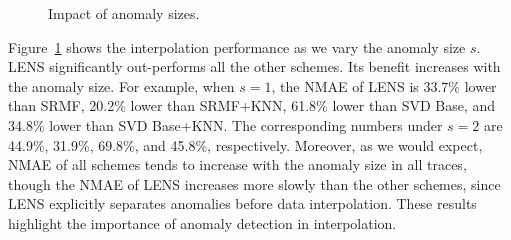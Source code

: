 \begin{figure}[h!]
{  }
  \caption{Impact of anomaly sizes.}
  \label{fig:anomaly-size-interpolation}
\end{figure}

Figure~\ref{fig:anomaly-size-interpolation} shows the interpolation
performance as we vary the anomaly size $s$. LENS 
significantly out-performs all the other schemes. Its benefit
increases with the anomaly size. For example, when $s=1$,
the NMAE of LENS is 33.7\% lower than SRMF,
20.2\% lower than SRMF+KNN, 61.8\% lower than SVD Base, and 34.8\% lower than
SVD Base+KNN. The corresponding numbers under $s=2$ are 44.9\%,
31.9\%, 69.8\%, and 45.8\%, respectively. Moreover, as we would expect, NMAE of
all schemes tends to increase with the anomaly size in all traces,
though the NMAE of LENS increases more slowly than the
other schemes, since LENS explicitly separates anomalies before data
interpolation. 
These results highlight the importance of anomaly detection in interpolation.


